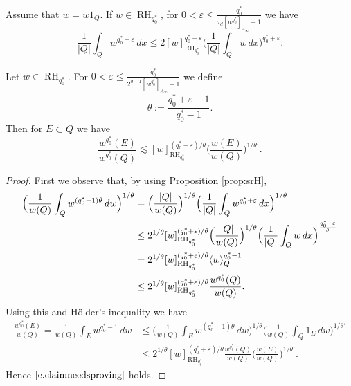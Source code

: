 \documentclass[10pt,a4paper]{amsart}
\begin{document}
\begin{proposition}
\label{prop:srH}
    Assume that $w=w 1_Q$. If $w\in \operatorname{RH}_{q_0^*}$, for $0 < \varepsilon \leq \frac{q_0^*}{\tau_{d} [w^{q_0^*}]_{A_{\infty}}-1 }$ we have
    \begin{equation*}        
    \frac{1}{|Q|} \int_Q w^{q_0^* + \varepsilon} \, dx \le 2[w]_{\operatorname{RH}_{q_0^*}}^{q_0^*+\varepsilon}\Big( \frac{1}{|Q|} \int_Q w \, dx \Big)^{q_0^* + \varepsilon}.
    \end{equation*}
\end{proposition}

\begin{lemma}
Let $w\in \operatorname{RH}_{q_0^*}$. 
For  $0 < \varepsilon \leq \frac{q_0^*}{2^{d+1} [w^{q_0^*}]_{A_{\infty}}-1 }$ we define
\begin{equation}
\label{eq:alpha}
\theta:=\frac{q_0^*+\varepsilon-1}{q_0^*-1}.
\end{equation}
Then for $E\subset Q$  we have
\begin{equation}\label{e.claimneedsproving}
\frac{w^{q_0^*}(E)}{w^{q_0^*}(Q)}\lesssim [w]_{\operatorname{RH}_{q_0^*}}^{(q_0^*+\varepsilon)/\theta}\Big(\frac{w(E)}{w(Q)}\Big)^{1/\theta'}.
\end{equation}
\end{lemma}

\begin{proof}
First we observe that, by using Proposition \ref{prop:srH}, %
\begin{align}
\label{eq:aux2}
\notag\Big(\frac{1}{w(Q)}\int_Qw^{(q_0^*-1)\theta}\,dw\Big)^{1/\theta}&=\Big(\frac{|Q|}{w(Q)}\Big)^{1/\theta}\Big(\frac{1}{|Q|}\int_Qw^{q_0^*+\varepsilon}\,dx\Big)^{1/\theta}\\
\notag& \leq 2^{1/\theta}[w]_{\operatorname{RH}_{q_0^*}}^{(q_0^*+\varepsilon)/\theta}\Big(\frac{|Q|}{w(Q)}\Big)^{1/\theta}\Big(\frac{1}{|Q|}\int_Qw\,dx\Big)^{\frac{q_0^*+\varepsilon}{\theta}}\\
&=2^{1/\theta} [w]_{\operatorname{RH}_{q_0^*}}^{(q_0^*+\varepsilon)/\theta}\langle w\rangle_Q^{q_0^*-1} \\
& \leq 2^{1/\theta}[w]_{\operatorname{RH}_{q_0^*}}^{(q_0^*+\varepsilon)/\theta} \frac{w^{q_0^*}(Q)}{w(Q)}.
\end{align}
Using this and H\"older's inequality we have
\begin{align*}
\frac{w^{q_0^*}(E)}{w(Q)}=\frac{1}{w(Q)}\int_Ew^{q_0^*-1}\,dw&\le \Big(\frac{1}{w(Q)}\int_Ew^{(q_0^*-1)\theta}\,dw\Big)^{1/\theta}\Big(\frac{1}{w(Q)}\int_Q1_E\,dw\Big)^{1/\theta'}\\
&\leq 2^{1/\theta}[w]_{\operatorname{RH}_{q_0^*}}^{(q_0^*+\varepsilon)/\theta} \frac{w^{q_0^*}(Q)}{w(Q)}\Big(\frac{w(E)}{w(Q)}\Big)^{1/\theta'}.
\end{align*}
Hence $\eqref{e.claimneedsproving}$ holds.

\end{proof}
\end{document}
